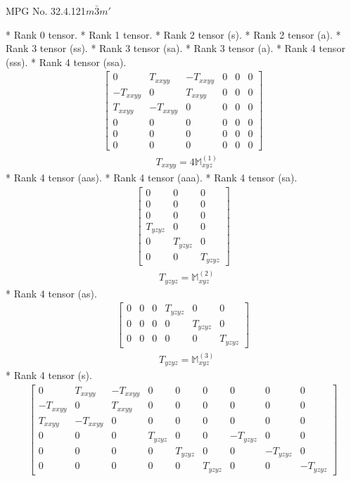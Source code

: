\documentclass[fleqn,8pt,landscape]{jsarticle}
\begin{document}
\setcounter{MaxMatrixCols}{32}

\renewcommand{\tablename}{Table~}
\renewcommand{\figurename}{Figure~}
\begin{center}
\LARGE
MPG No. 32.4.121\quad$m\bar{3}m'$
\end{center}
* Rank 0 tensor.
* Rank 1 tensor.
* Rank 2 tensor (s).
* Rank 2 tensor (a).
* Rank 3 tensor (ss).
* Rank 3 tensor (sa).
* Rank 3 tensor (a).
* Rank 4 tensor (sss).
* Rank 4 tensor (ssa).
\begin{align*}
\begin{bmatrix} 0 & T_{xxyy} & - T_{xxyy} & 0 & 0 & 0 \\ - T_{xxyy} & 0 & T_{xxyy} & 0 & 0 & 0 \\ T_{xxyy} & - T_{xxyy} & 0 & 0 & 0 & 0 \\ 0 & 0 & 0 & 0 & 0 & 0 \\ 0 & 0 & 0 & 0 & 0 & 0 \\ 0 & 0 & 0 & 0 & 0 & 0 \end{bmatrix}
\end{align*}
\begin{align*}
& T_{xxyy} = 4 \mathbb{M}_{xyz}^{(1)}
\end{align*}
* Rank 4 tensor (aas).
* Rank 4 tensor (aaa).
* Rank 4 tensor (sa).
\begin{align*}
\begin{bmatrix} 0 & 0 & 0 \\ 0 & 0 & 0 \\ 0 & 0 & 0 \\ T_{yzyz} & 0 & 0 \\ 0 & T_{yzyz} & 0 \\ 0 & 0 & T_{yzyz} \end{bmatrix}
\end{align*}
\begin{align*}
& T_{yzyz} = \mathbb{M}_{xyz}^{(2)}
\end{align*}
* Rank 4 tensor (as).
\begin{align*}
\begin{bmatrix} 0 & 0 & 0 & T_{yzyz} & 0 & 0 \\ 0 & 0 & 0 & 0 & T_{yzyz} & 0 \\ 0 & 0 & 0 & 0 & 0 & T_{yzyz} \end{bmatrix}
\end{align*}
\begin{align*}
& T_{yzyz} = \mathbb{M}_{xyz}^{(3)}
\end{align*}
* Rank 4 tensor (s).
\begin{align*}
\begin{bmatrix} 0 & T_{xxyy} & - T_{xxyy} & 0 & 0 & 0 & 0 & 0 & 0 \\ - T_{xxyy} & 0 & T_{xxyy} & 0 & 0 & 0 & 0 & 0 & 0 \\ T_{xxyy} & - T_{xxyy} & 0 & 0 & 0 & 0 & 0 & 0 & 0 \\ 0 & 0 & 0 & T_{yzyz} & 0 & 0 & - T_{yzyz} & 0 & 0 \\ 0 & 0 & 0 & 0 & T_{yzyz} & 0 & 0 & - T_{yzyz} & 0 \\ 0 & 0 & 0 & 0 & 0 & T_{yzyz} & 0 & 0 & - T_{yzyz} \end{bmatrix}
\end{align*}
\end{document}
